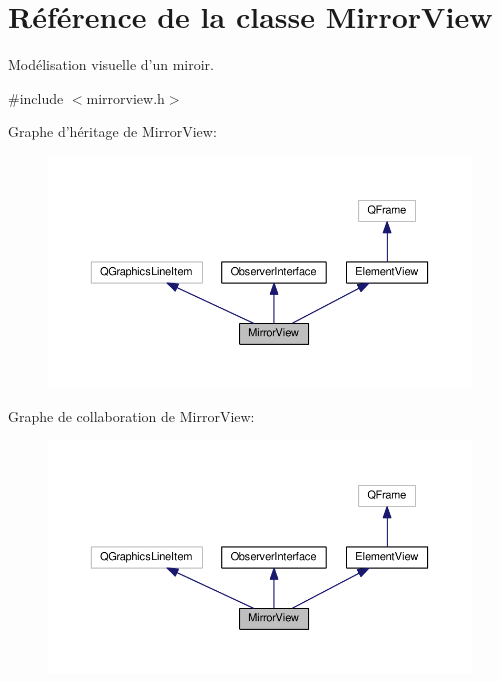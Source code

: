 \hypertarget{classMirrorView}{\section{Référence de la classe Mirror\+View}
\label{classMirrorView}
}


Modélisation visuelle d’un miroir.  




{\ttfamily \#include $<$mirrorview.\+h$>$}



Graphe d'héritage de Mirror\+View\+:
\nopagebreak
\begin{figure}[H]
\begin{center}
\leavevmode
\includegraphics[width=350pt]{d2/d7b/classMirrorView__inherit__graph}
\end{center}
\end{figure}


Graphe de collaboration de Mirror\+View\+:
\nopagebreak
\begin{figure}[H]
\begin{center}
\leavevmode
\includegraphics[width=350pt]{d1/de7/classMirrorView__coll__graph}
\end{center}
\end{figure}
